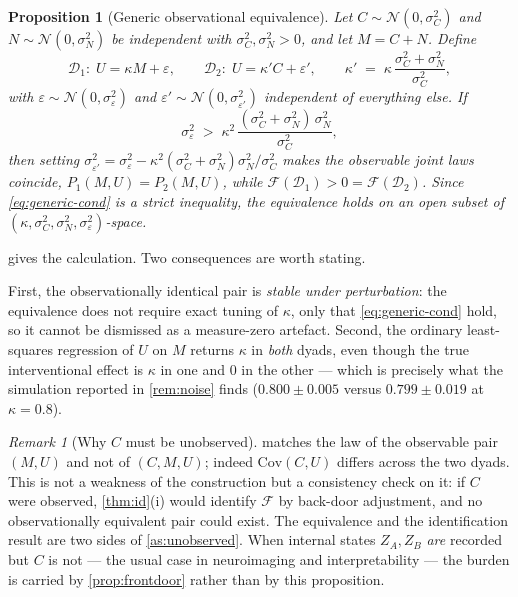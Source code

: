 \documentclass[11pt,a4paper]{article}
\theoremstyle{plain}
\newtheorem{proposition}[proposition]{Proposition}
\theoremstyle{definition}
\theoremstyle{remark}
\newtheorem{remark}[remark]{Remark}
\newcommand{\Fc}{\mathcal{F}}
\newcommand{\Dy}{\mathcal{D}}
\newcommand{\Cov}{\mathrm{Cov}}
\begin{document}
\begin{proposition}[Generic observational equivalence]\label{prop:generic}
Let $C \sim \mathcal{N}(0,\sigma_C^2)$ and $N \sim \mathcal{N}(0,\sigma_N^2)$ be independent
with $\sigma_C^2, \sigma_N^2 > 0$, and let $M = C + N$. Define
\[
\Dy_1:\; U = \kappa M + \varepsilon,
\qquad
\Dy_2:\; U = \kappa' C + \varepsilon',
\qquad
\kappa' \;=\; \kappa\,\frac{\sigma_C^2 + \sigma_N^2}{\sigma_C^2},
\]
with $\varepsilon \sim \mathcal{N}(0,\sigma_\varepsilon^2)$ and
$\varepsilon' \sim \mathcal{N}(0,\sigma_{\varepsilon'}^2)$ independent of everything else.
If
\begin{equation}\label{eq:generic-cond}
\sigma_\varepsilon^2 \;>\; \kappa^2\,\frac{(\sigma_C^2+\sigma_N^2)\,\sigma_N^2}{\sigma_C^2},
\end{equation}
then setting
$\sigma_{\varepsilon'}^2 = \sigma_\varepsilon^2 - \kappa^2(\sigma_C^2+\sigma_N^2)\sigma_N^2/\sigma_C^2$
makes the observable joint laws coincide, $P_1(M,U) = P_2(M,U)$, while
$\Fc(\Dy_1) > 0 = \Fc(\Dy_2)$. Since \eqref{eq:generic-cond} is a strict inequality,
the equivalence holds on an open subset of
$(\kappa, \sigma_C^2, \sigma_N^2, \sigma_\varepsilon^2)$-space.
\end{proposition}

 gives the calculation. Two consequences are worth stating.

First, the observationally identical pair is \emph{stable under perturbation}: the equivalence
does not require exact tuning of $\kappa$, only that \eqref{eq:generic-cond} hold, so it
cannot be dismissed as a measure-zero artefact. Second, the ordinary least-squares regression
of $U$ on $M$ returns $\kappa$ in \emph{both} dyads, even though the true interventional
effect is $\kappa$ in one and $0$ in the other --- which is precisely what the simulation
reported in \cref{rem:noise} finds ($0.800 \pm 0.005$ versus $0.799 \pm 0.019$ at
$\kappa = 0.8$).

\begin{remark}[Why $C$ must be unobserved]
 matches the law of the observable pair $(M,U)$ and not of $(C,M,U)$; indeed
$\Cov(C,U)$ differs across the two dyads. This is not a weakness of the construction but a
consistency check on it: if $C$ were observed, \cref{thm:id}(i) would identify $\Fc$ by
back-door adjustment, and no observationally equivalent pair could exist. The equivalence and
the identification result are two sides of \cref{as:unobserved}. When internal states $Z_A,
Z_B$ \emph{are} recorded but $C$ is not --- the usual case in neuroimaging and
interpretability --- the burden is carried by \cref{prop:frontdoor} rather than by this
proposition.
\end{remark}
\end{document}
